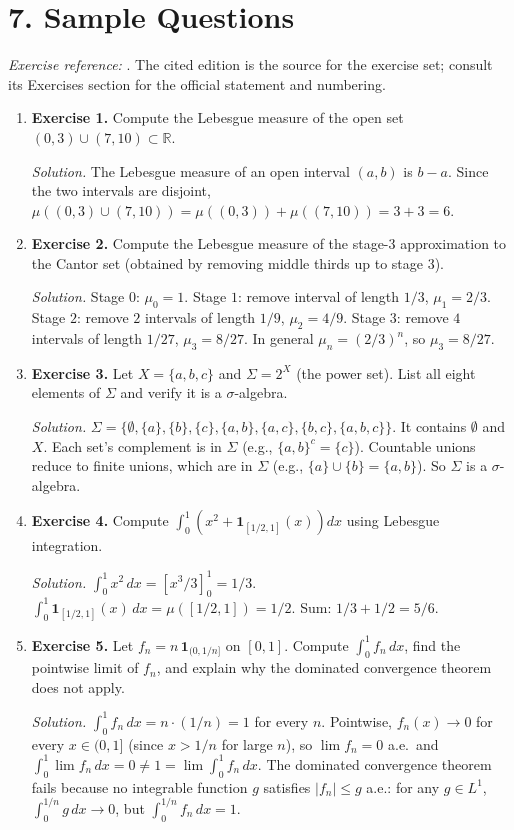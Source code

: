 \section*{7. Sample Questions}
\emph{Exercise reference:} \cite{measure_theory_ref1}. The cited edition is the source for the exercise set; consult its Exercises section for the official statement and numbering.
\begin{enumerate}[leftmargin=*,itemsep=0.9em]
\item \textbf{Exercise 1.} Compute the Lebesgue measure of the open set $(0,3)\cup(7,10)\subset\mathbb{R}$.

\emph{Solution.} The Lebesgue measure of an open interval $(a,b)$ is $b-a$. Since the two intervals are disjoint, $\mu((0,3)\cup(7,10))=\mu((0,3))+\mu((7,10))=3+3=6$.

\item \textbf{Exercise 2.} Compute the Lebesgue measure of the stage-3 approximation to the Cantor set (obtained by removing middle thirds up to stage $3$).

\emph{Solution.} Stage $0$: $\mu_0=1$. Stage $1$: remove interval of length $1/3$, $\mu_1=2/3$. Stage $2$: remove $2$ intervals of length $1/9$, $\mu_2=4/9$. Stage $3$: remove $4$ intervals of length $1/27$, $\mu_3=8/27$. In general $\mu_n=(2/3)^n$, so $\mu_3=8/27$.

\item \textbf{Exercise 3.} Let $X=\{a,b,c\}$ and $\Sigma=2^X$ (the power set). List all eight elements of $\Sigma$ and verify it is a $\sigma$-algebra.

\emph{Solution.} $\Sigma=\{\emptyset,\{a\},\{b\},\{c\},\{a,b\},\{a,c\},\{b,c\},\{a,b,c\}\}$. It contains $\emptyset$ and $X$. Each set's complement is in $\Sigma$ (e.g., $\{a,b\}^c=\{c\}$). Countable unions reduce to finite unions, which are in $\Sigma$ (e.g., $\{a\}\cup\{b\}=\{a,b\}$). So $\Sigma$ is a $\sigma$-algebra.

\item \textbf{Exercise 4.} Compute $\int_0^1\left(x^2+\mathbf{1}_{[1/2,1]}(x)\right)dx$ using Lebesgue integration.

\emph{Solution.} $\int_0^1 x^2\,dx=[x^3/3]_0^1=1/3$. $\int_0^1\mathbf{1}_{[1/2,1]}(x)\,dx=\mu([1/2,1])=1/2$. Sum: $1/3+1/2=5/6$.

\item \textbf{Exercise 5.} Let $f_n=n\,\mathbf{1}_{(0,1/n]}$ on $[0,1]$. Compute $\int_0^1 f_n\,dx$, find the pointwise limit of $f_n$, and explain why the dominated convergence theorem does not apply.

\emph{Solution.} $\int_0^1 f_n\,dx=n\cdot(1/n)=1$ for every $n$. Pointwise, $f_n(x)\to 0$ for every $x\in(0,1]$ (since $x>1/n$ for large $n$), so $\lim f_n=0$ a.e.~and $\int_0^1\lim f_n\,dx=0\neq 1=\lim\int_0^1 f_n\,dx$. The dominated convergence theorem fails because no integrable function $g$ satisfies $|f_n|\leq g$ a.e.: for any $g\in L^1$, $\int_0^{1/n}g\,dx\to 0$, but $\int_0^{1/n}f_n\,dx=1$.

\end{enumerate}
